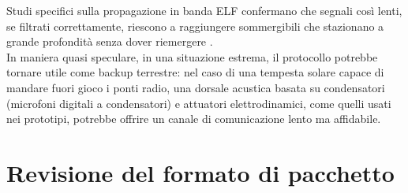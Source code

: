  Studi specifici sulla propagazione in banda ELF confermano che segnali così lenti, se filtrati correttamente,
  riescono a raggiungere sommergibili che stazionano a grande profondità senza dover riemergere \citep{ferguson1986elf}. \\

  In maniera quasi speculare, in una situazione estrema, il protocollo potrebbe tornare utile come backup terrestre: nel caso di una tempesta solare capace di
   mandare fuori gioco i ponti radio, una dorsale acustica basata su condensatori (microfoni digitali a condensatori) e attuatori elettrodinamici, come 
    quelli usati nei prototipi,
    potrebbe offrire un canale di comunicazione lento ma affidabile.\\

\section{Revisione del formato di pacchetto}
\label{sec:pacchetti_future}


